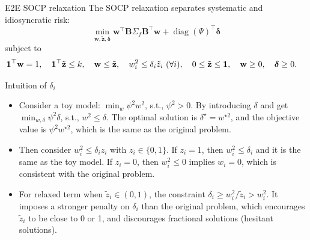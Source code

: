 \documentclass[10pt,aspectratio=169]{beamer}
\newcommand{\Kcard}{k}
\newcommand{\SigmaMat}{\Sigma}
\newcommand{\diagv}{\operatorname{diag}}
\begin{document}
\begin{frame}{E2E SOCP relaxation}
  \small
  The SOCP relaxation separates systematic and idiosyncratic risk:
  \[
    \min_{\mathbf{w},\tilde{\mathbf z},\boldsymbol{\delta}}
    \mathbf{w}^\top \mathbf{B}\SigmaMat_f \mathbf{B}^\top \mathbf{w}
    + \diagv(\Psi)^\top\boldsymbol{\delta}
  \]
  subject to
  \[
  \begin{aligned}
    &\one^\top \mathbf{w}=1,\quad
      \one^\top \tilde{\mathbf z}\le \Kcard,\quad
      \mathbf{w}\le \tilde{\mathbf z},\quad
      w_i^2 \le \delta_i \tilde z_i ~(\forall i),  \quad 0\le\tilde{\mathbf z}\le\one,\quad
      \mathbf{w}\ge0,\quad
      \boldsymbol{\delta}\ge0.
  \end{aligned}
  \]

\begin{block}{\small Intuition of $\delta_i$}
  \footnotesize
      \vspace{0.4em}
  \begin{itemize}
    \item Consider a toy model: $\min_w \psi^2 w^2$, s.t., $\psi^2 > 0$. By introducing $\delta$ and get $\min_{w,\delta} \psi^2 \delta$, s.t., $w^2 \le \delta$. The optimal solution is $\delta^\star = w^{\star 2}$, and the objective value is $\psi^2 w^{\star 2}$, which is the same as the original problem.
    \item Then consider $w_i^2 \le \delta_i z_i$ with $z_i \in \{0,1\}$. If $z_i=1$, then $w_i^2 \le \delta_i$ and it is the same as the toy model. If $z_i=0$, then $w_i^2 \le 0$ implies $w_i=0$, which is consistent with the original problem.
    \item For relaxed term when $\tilde z_i \in (0,1)$, the constraint $\delta_i \geq w_i^2/\tilde z_i > w_i^2$. It imposes a stronger penalty on $\delta_i$ than the original problem, which encourages $\tilde z_i$ to be close to 0 or 1, and discourages fractional solutions (hesitant solutions).
  \end{itemize}
\end{block}
\end{frame}
\end{document}
